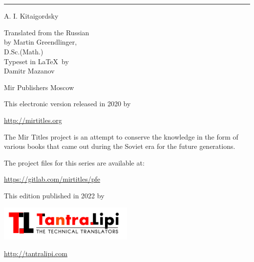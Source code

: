

\cleardoublepage
\thispagestyle{empty}
\vspace*{1cm}
\begin{center}
\selectfont{\Huge Physics for Everyone} \\[10pt] 
\selectfont{\LARGE Book 4: Photons and Nuclei} \\[10pt]
\hrule
\vspace{10pt}

{\Large A. I. Kitaigordsky}\\[15pt]
\begin{flushright}
Translated from the Russian \\by Martin Greendlinger,\\
D.Sc.(Math.)\\[15pt]
Typeset in \LaTeX \, by\\ Damitr Mazanov
\end{flushright}
\vspace{4cm}
{\Large Mir Publishers Moscow}
\end{center}
\cleardoublepage

\vfill
\vspace*{1cm}
This electronic version released in 2020 by 

\url{http://mirtitles.org}

{\small The Mir Titles project is an attempt to conserve the knowledge in the form of various books that came out during the Soviet era for the future generations.}

The project files for this series are available at:

\url{https://gitlab.com/mirtitles/pfe}

This edition published in 2022 by 

\includegraphics[width=0.5\textwidth]{figures/tantralipi-logo.pdf}

\url{http://tantralipi.com}


\thispagestyle{empty}
\clearpage